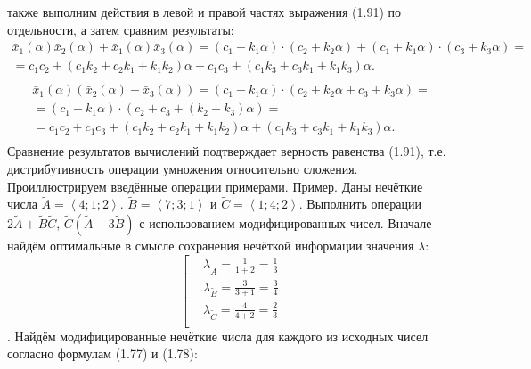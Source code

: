 также выполним действия в левой и правой частях выражения (1.91) по отдельности, а затем сравним результаты:
\[\begin{matrix}
  {{{\bar{x}}}_{1}}\left( \alpha  \right){{{\bar{x}}}_{2}}\left( \alpha  \right)+{{{\bar{x}}}_{1}}\left( \alpha  \right){{{\bar{x}}}_{3}}\left( \alpha  \right)=({{c}_{1}}+{{k}_{1}}\alpha )\cdot ({{c}_{2}}+{{k}_{2}}\alpha )+({{c}_{1}}+{{k}_{1}}\alpha )\cdot ({{c}_{3}}+{{k}_{3}}\alpha )= \\ 
  ={{c}_{1}}{{c}_{2}}+({{c}_{1}}{{k}_{2}}+{{c}_{2}}{{k}_{1}}+{{k}_{1}}{{k}_{2}})\alpha +{{c}_{1}}{{c}_{3}}+({{c}_{1}}{{k}_{3}}+{{c}_{3}}{{k}_{1}}+{{k}_{1}}{{k}_{3}})\alpha . \\ 
\end{matrix}\] 
\[\begin{matrix}
  {{{\bar{x}}}_{1}}\left( \alpha  \right)\left( {{{\bar{x}}}_{2}}\left( \alpha  \right)+{{{\bar{x}}}_{3}}\left( \alpha  \right) \right)=({{c}_{1}}+{{k}_{1}}\alpha )\cdot ({{c}_{2}}+{{k}_{2}}\alpha +{{c}_{3}}+{{k}_{3}}\alpha )= \\ 
  =({{c}_{1}}+{{k}_{1}}\alpha )\cdot ({{c}_{2}}+{{c}_{3}}+({{k}_{2}}+{{k}_{3}})\alpha )= \\ 
  ={{c}_{1}}{{c}_{2}}+{{c}_{1}}{{c}_{3}}+({{c}_{1}}{{k}_{2}}+{{c}_{2}}{{k}_{1}}+{{k}_{1}}{{k}_{2}})\alpha +({{c}_{1}}{{k}_{3}}+{{c}_{3}}{{k}_{1}}+{{k}_{1}}{{k}_{3}})\alpha . \\ 
\end{matrix}\] 
Сравнение результатов вычислений подтверждает верность равенства (1.91), т.е. дистрибутивность операции умножения относительно сложения.
Проиллюстрируем введённые операции примерами.
Пример. Даны нечёткие числа $\tilde{A}=\left\langle 4;1;2 \right\rangle $. $\tilde{B}=\left\langle 7;3;1 \right\rangle $ и $\tilde{C}=\left\langle 1;4;2 \right\rangle $. Выполнить операции $2\tilde{A}+\tilde{B}\tilde{C}$, $\tilde{C}\left( \tilde{A}-3\tilde{B} \right)$ с использованием модифицированных чисел.
Вначале найдём оптимальные в смысле сохранения нечёткой информации значения $\lambda$:
	\[\left[ \begin{aligned}
  & {{\lambda }_{{\tilde{A}}}}=\frac{1}{1+2}=\frac{1}{3} \\ 
 & {{\lambda }_{{\tilde{B}}}}=\frac{3}{3+1}=\frac{3}{4} \\ 
 & {{\lambda }_{{\tilde{C}}}}=\frac{4}{4+2}=\frac{2}{3} \\ 
\end{aligned} \right.\].
Найдём модифицированные нечёткие числа для каждого из исходных чисел согласно формулам (1.77) и (1.78):
